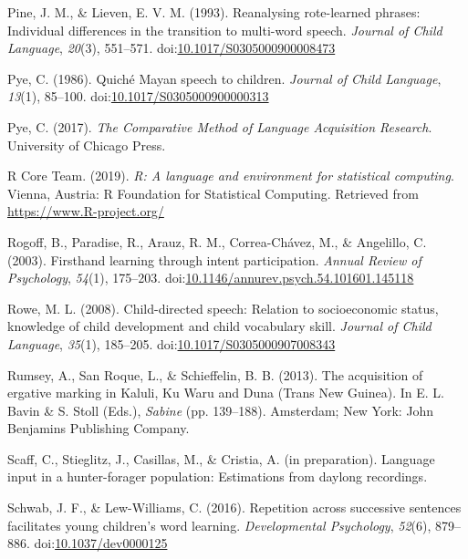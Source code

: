 \documentclass[,man,floatsintext]{apa6}
\begin{document}
\hypertarget{ref-pine1993reanalysing}{}
Pine, J. M., \& Lieven, E. V. M. (1993). Reanalysing rote-learned
phrases: Individual differences in the transition to multi-word speech.
\emph{Journal of Child Language}, \emph{20}(3), 551--571.
doi:\href{https://doi.org/10.1017/S0305000900008473}{10.1017/S0305000900008473}

\hypertarget{ref-pye1986quiche}{}
Pye, C. (1986). Quiché Mayan speech to children. \emph{Journal of Child
Language}, \emph{13}(1), 85--100.
doi:\href{https://doi.org/10.1017/S0305000900000313}{10.1017/S0305000900000313}

\hypertarget{ref-pye2017comparative}{}
Pye, C. (2017). \emph{The Comparative Method of Language Acquisition
Research}. University of Chicago Press.

\hypertarget{ref-R-base}{}
R Core Team. (2019). \emph{R: A language and environment for statistical
computing}. Vienna, Austria: R Foundation for Statistical Computing.
Retrieved from \url{https://www.R-project.org/}

\hypertarget{ref-rogoff2003firsthand}{}
Rogoff, B., Paradise, R., Arauz, R. M., Correa-Chávez, M., \& Angelillo,
C. (2003). Firsthand learning through intent participation. \emph{Annual
Review of Psychology}, \emph{54}(1), 175--203.
doi:\href{https://doi.org/10.1146/annurev.psych.54.101601.145118}{10.1146/annurev.psych.54.101601.145118}

\hypertarget{ref-rowe2008child}{}
Rowe, M. L. (2008). Child-directed speech: Relation to socioeconomic
status, knowledge of child development and child vocabulary skill.
\emph{Journal of Child Language}, \emph{35}(1), 185--205.
doi:\href{https://doi.org/10.1017/S0305000907008343}{10.1017/S0305000907008343}

\hypertarget{ref-rumsey2013ergative}{}
Rumsey, A., San Roque, L., \& Schieffelin, B. B. (2013). The acquisition
of ergative marking in Kaluli, Ku Waru and Duna (Trans New Guinea). In
E. L. Bavin \& S. Stoll (Eds.), \emph{Sabine} (pp. 139--188). Amsterdam;
New York: John Benjamins Publishing Company.

\hypertarget{ref-scaffIPlanguage}{}
Scaff, C., Stieglitz, J., Casillas, M., \& Cristia, A. (in preparation).
Language input in a hunter-forager population: Estimations from daylong
recordings.

\hypertarget{ref-schwab2016repetition}{}
Schwab, J. F., \& Lew-Williams, C. (2016). Repetition across successive
sentences facilitates young children's word learning.
\emph{Developmental Psychology}, \emph{52}(6), 879--886.
doi:\href{https://doi.org/10.1037/dev0000125}{10.1037/dev0000125}
\end{document}

